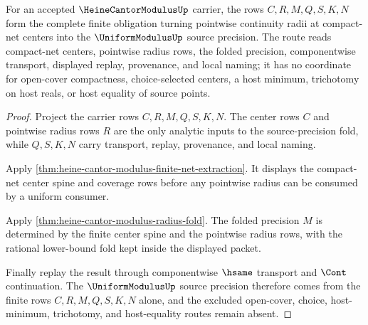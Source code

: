 \begin{theorem}
\label{thm:heine-cantor-modulus-pointwise-radius-fold}
For an accepted $\HeineCantorModulusUp$ carrier, the rows $C,R,M,Q,S,K,N$ form the complete finite obligation turning pointwise continuity radii at compact-net centers into the $\UniformModulusUp$ source precision. The route reads compact-net centers, pointwise radius rows, the folded precision, componentwise transport, displayed replay, provenance, and local naming; it has no coordinate for open-cover compactness, choice-selected centers, a host minimum, trichotomy on host reals, or host equality of source points.
\end{theorem}
\begin{proof}
Project the carrier rows $C,R,M,Q,S,K,N$. The center rows $C$ and pointwise radius rows $R$ are the only analytic inputs to the source-precision fold, while $Q,S,K,N$ carry transport, replay, provenance, and local naming.

Apply \autoref{thm:heine-cantor-modulus-finite-net-extraction}. It displays the compact-net center spine and coverage rows before any pointwise radius can be consumed by a uniform consumer.

Apply \autoref{thm:heine-cantor-modulus-radius-fold}. The folded precision $M$ is determined by the finite center spine and the pointwise radius rows, with the rational lower-bound fold kept inside the displayed packet.

Finally replay the result through componentwise $\hsame$ transport and $\Cont$ continuation. The $\UniformModulusUp$ source precision therefore comes from the finite rows $C,R,M,Q,S,K,N$ alone, and the excluded open-cover, choice, host-minimum, trichotomy, and host-equality routes remain absent.
\end{proof}

